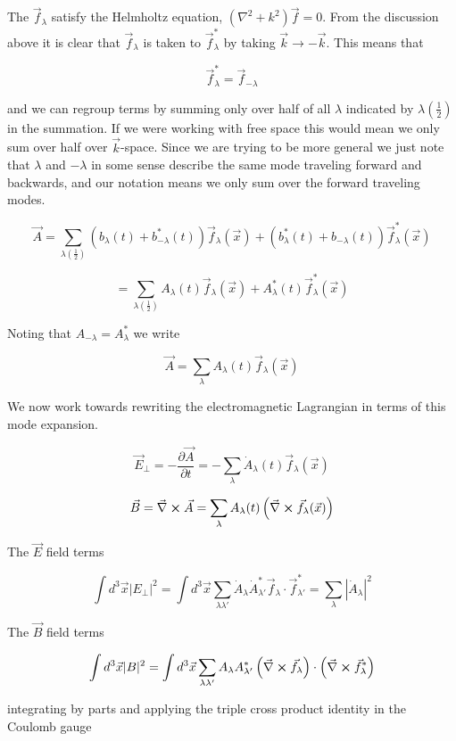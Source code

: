 \documentclass[12pt]{article}
\newcommand{\pardiv}[2][]{\frac{\partial #1}{\partial #2}}
\newcommand{\vecnab}{\vec{\nabla}}
\begin{document}
The $\vec{f}_{\lambda}$ satisfy the Helmholtz equation, $(\nabla^2+k^2)\vec{f}=0$.
From the discussion above it is clear that $\vec{f}_{\lambda}$ is taken to $\vec{f}_{\lambda}^*$ by taking $\vec{k}\rightarrow -\vec{k}$. This means that

\[ \vec{f}_{\lambda}^* = \vec{f}_{-\lambda} \]

and we can regroup terms by summing only over half of all $\lambda$ indicated by $\lambda \left( \frac{1}{2}\right)$ in the summation.
If we were working with free space this would mean we only sum over half over $\vec{k}$-space.
Since we are trying to be more general we just note that $\lambda$ and $-\lambda$ in some sense describe the same mode traveling forward and backwards, and our notation means we only sum over the forward traveling modes.

\[ \vec{A} = \sum_{\lambda \left(\frac{1}{2}\right)} (b_{\lambda}(t) + b_{-\lambda}^*(t))\vec{f}_{\lambda}(\vec{x}) +(b_{\lambda}^*(t) + b_{-\lambda}(t))\vec{f}_{\lambda}^*(\vec{x})    \]

\[ = \sum_{\lambda \left( \frac{1}{2} \right)} A_\lambda(t)\vec{f}_{\lambda}(\vec{x}) +A_{\lambda}^*(t) \vec{f}_{\lambda}^*(\vec{x}) \]

Noting that $A_{-\lambda} = A_{\lambda}^*$ we write

\[\vec{A} = \sum_{\lambda} A_{\lambda}(t) \vec{f}_{\lambda}(\vec{x}) \]

We now work towards rewriting the electromagnetic Lagrangian in terms of this mode expansion.

\[\vec{E}_{\perp} = -\pardiv[\vec{A}]{t}=-\sum_{\lambda}\dot{A}_{\lambda}(t) \vec{f}_{\lambda}(\vec{x}) \]

\[ \vec{B} = \vecnab \cross \vec{A} = \sum_{\lambda}A_{\lambda}(t)\left(\vecnab \cross \vec{f}_{\lambda}(\vec{x})\right) \]

The $\vec{E}$ field terms

\[ \int d^3 \vec{x} |E_{\perp}|^2 = \int d^3 \vec{x} \sum_{\lambda \lambda'} \dot{A}_{\lambda} \dot{A}^*_{\lambda'} \vec{f}_{\lambda} \cdot \vec{f}_{\lambda'}^* = \sum_{\lambda} |\dot{A}_{\lambda}|^2 \]

The $\vec{B}$ field terms

\[ \int d^3 \vec{x} |B|^2 = \int d^3 \vec{x} \sum_{\lambda \lambda'} A_{\lambda} A_{\lambda'}^* \left(\vecnab\cross \vec{f}_{\lambda}\right)\cdot\left(\vecnab\cross\vec{f}_{\lambda}^*\right) \]

integrating by parts and applying the triple cross product identity in the Coulomb gauge
\end{document}
